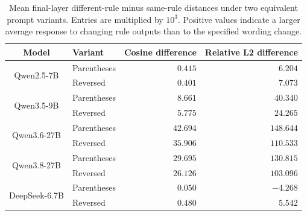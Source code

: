 \begin{table}[!htbp]
\centering
\caption{Mean final-layer different-rule minus same-rule distances under two equivalent prompt variants. Entries are multiplied by $10^3$. Positive values indicate a larger average response to changing rule outputs than to the specified wording change.}
\label{tab:wording-control}
\small
\setlength{\tabcolsep}{4pt}
\begin{tabular}{clrr}
\toprule
Model & Variant & Cosine difference & Relative L2 difference \\
\midrule
\multirow{2}{*}{Qwen2.5-7B} & Parentheses & $0.415$ & $6.204$ \\
 & Reversed & $0.401$ & $7.073$ \\
\multirow{2}{*}{Qwen3.5-9B} & Parentheses & $8.661$ & $40.340$ \\
 & Reversed & $5.775$ & $24.265$ \\
\multirow{2}{*}{Qwen3.6-27B} & Parentheses & $42.694$ & $148.644$ \\
 & Reversed & $35.906$ & $110.533$ \\
\multirow{2}{*}{Qwen3.8-27B} & Parentheses & $29.695$ & $130.815$ \\
 & Reversed & $26.126$ & $103.096$ \\
\multirow{2}{*}{DeepSeek-6.7B} & Parentheses & $0.050$ & $-4.268$ \\
 & Reversed & $0.480$ & $5.542$ \\
\bottomrule
\end{tabular}
\end{table}
